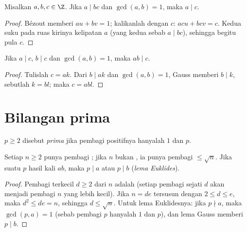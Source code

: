 \begin{theorem}\label{thm:g12:arith:gauss}
Misalkan $a, b, c \in \Z$. Jika $a \mid bc$ dan $\gcd(a, b) = 1$, maka $a \mid c$.
\end{theorem}

\begin{proof}
Bézout memberi $au + bv = 1$; kalikanlah dengan $c$: $acu + bcv = c$. Kedua suku
pada ruas kirinya kelipatan $a$ (yang kedua sebab $a \mid bc$), sehingga
begitu pula $c$.
\end{proof}

\begin{corollary}\label{cor:g12:arith:coprimeprod}
Jika $a \mid c$, $b \mid c$ dan $\gcd(a,b) = 1$, maka $ab \mid c$.
\end{corollary}

\begin{proof}
Tulislah $c = ak$. Dari $b \mid ak$ dan $\gcd(a,b)=1$, Gauss memberi
$b \mid k$, sebutlah $k = bl$; maka $c = abl$.
\end{proof}

\section{Bilangan prima}

\begin{definition}[Prima]\label{def:g12:arith:prime}
 $p \geq 2$ disebut \emph{prima} jika
pembagi positifnya hanyalah $1$ dan $p$.
\end{definition}

\begin{proposition}\label{prop:g12:arith:primedivides}
Setiap  $n \geq 2$ punya pembagi ; jika $n$ bukan , ia punya
pembagi  $\leq \sqrt n$. Jika suatu  $p$  hasil kali $ab$, maka
$p \mid a$ atau $p \mid b$ (\emph{lema Euklides}).
\end{proposition}

\begin{proof}
Pembagi terkecil $d \geq 2$ dari $n$ adalah  (setiap pembagi sejati $d$
akan menjadi pembagi $n$ yang lebih kecil). Jika $n = de$ tersusun dengan
$2 \leq d \leq e$, maka $d^2 \leq de = n$, sehingga $d \leq \sqrt n$. Untuk lema
Euklidesnya: jika $p \nmid a$, maka $\gcd(p, a) = 1$ (sebab pembagi $p$ hanyalah
$1$ dan $p$), dan lema Gauss memberi $p \mid b$.
\end{proof}


